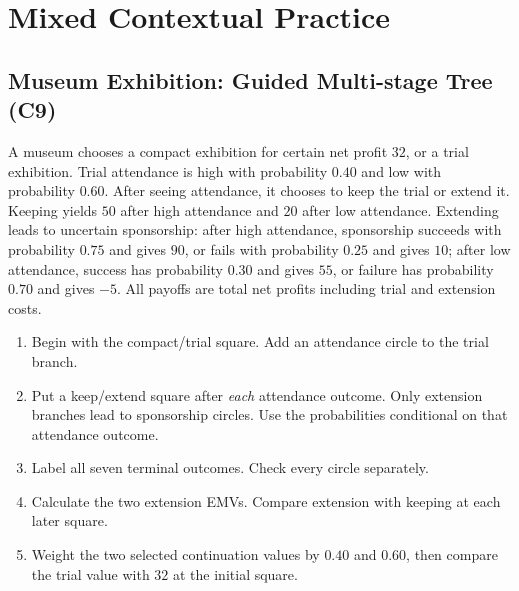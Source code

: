 \section{Mixed Contextual Practice}\label{sec:mixed}

\subsection{Museum Exhibition: Guided Multi-stage Tree (C9)}\label{sec:museum}
A museum chooses a compact exhibition for certain net profit $32$, or a trial exhibition. Trial attendance is high with probability $0.40$ and low with probability $0.60$. After seeing attendance, it chooses to keep the trial or extend it. Keeping yields $50$ after high attendance and $20$ after low attendance. Extending leads to uncertain sponsorship: after high attendance, sponsorship succeeds with probability $0.75$ and gives $90$, or fails with probability $0.25$ and gives $10$; after low attendance, success has probability $0.30$ and gives $55$, or failure has probability $0.70$ and gives $-5$. All payoffs are total net profits including trial and extension costs.
\label{task:museum}
\begin{enumerate}
\item Begin with the compact/trial square. Add an attendance circle to the trial branch.
\item Put a keep/extend square after \emph{each} attendance outcome. Only extension branches lead to sponsorship circles. Use the probabilities conditional on that attendance outcome.
\item Label all seven terminal outcomes. Check every circle separately.
\item Calculate the two extension EMVs. Compare extension with keeping at each later square.
\item Weight the two selected continuation values by $0.40$ and $0.60$, then compare the trial value with $32$ at the initial square.
\end{enumerate}

